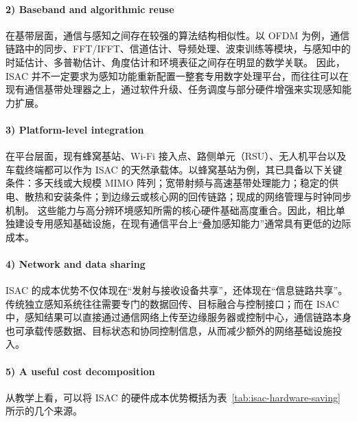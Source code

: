\paragraph{2) Baseband and algorithmic reuse}
在基带层面，通信与感知之间存在较强的算法结构相似性。以 OFDM 为例，通信链路中的同步、FFT/IFFT、信道估计、导频处理、波束训练等模块，与感知中的时延估计、多普勒估计、角度估计和环境表征之间存在明显的数学关联\cite{Liu2022ISAC,Sturm2011WaveformDesign}。  
因此，ISAC 并不一定要求为感知功能重新配置一整套专用数字处理平台，而往往可以在现有通信基带处理器之上，通过软件升级、任务调度与部分硬件增强来实现感知能力扩展。
\paragraph{3) Platform-level integration}
在平台层面，现有蜂窝基站、Wi-Fi 接入点、路侧单元（RSU）、无人机平台以及车载终端都可以作为 ISAC 的天然承载体。以蜂窝基站为例，其已具备以下关键条件：多天线或大规模 MIMO 阵列；宽带射频与高速基带处理能力；稳定的供电、散热和安装条件；到边缘云或核心网的回传链路；现成的网络管理与时钟同步机制。
这些能力与高分辨环境感知所需的核心硬件基础高度重合。因此，相比单独建设专用感知基础设施，在现有通信平台上“叠加感知能力”通常具有更低的边际成本。
\paragraph{4) Network and data sharing}
ISAC 的成本优势不仅体现在“发射与接收设备共享”，还体现在“信息链路共享”。传统独立感知系统往往需要专门的数据回传、目标融合与控制接口；而在 ISAC 中，感知结果可以直接通过通信网络上传至边缘服务器或控制中心，通信链路本身也可承载传感数据、目标状态和协同控制信息，从而减少额外的网络基础设施投入。
\paragraph{5) A useful cost decomposition}
从教学上看，可以将 ISAC 的硬件成本优势概括为表~\ref{tab:isac-hardware-saving} 所示的几个来源。

